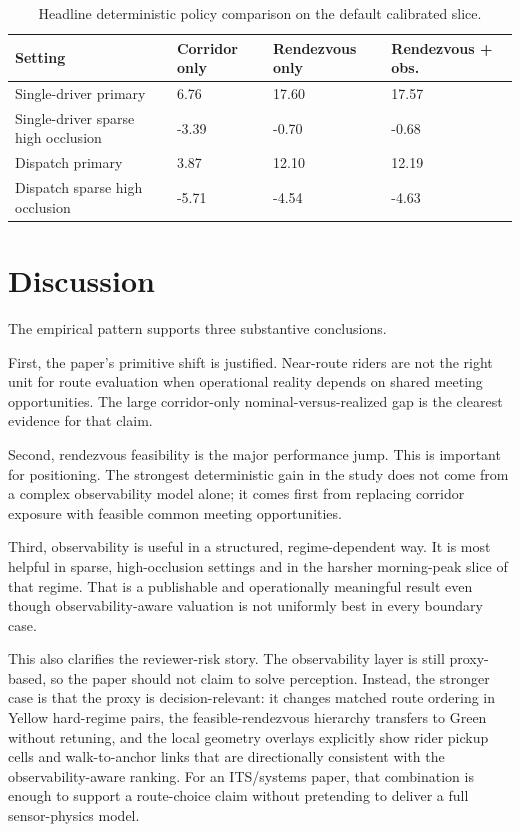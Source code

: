 \documentclass[journal]{IEEEtran}
\begin{document}
\begin{table}[!t]
\caption{Headline deterministic policy comparison on the default calibrated slice.}
\label{tab:headline}
\centering
\footnotesize
\begin{tabularx}{\columnwidth}{|L{0.34\columnwidth}|X|X|X|}
\hline
{}\textbf{Setting} & \textbf{Corridor only} & \textbf{Rendezvous only} & \textbf{Rendezvous + obs.} \\
\hline
Single-driver primary & 6.76 & 17.60 & 17.57 \\
\hline
Single-driver sparse high occlusion & -3.39 & -0.70 & -0.68 \\
\hline
Dispatch primary & 3.87 & 12.10 & 12.19 \\
\hline
Dispatch sparse high occlusion & -5.71 & -4.54 & -4.63 \\
\hline
\end{tabularx}
\end{table}

\section{Discussion}
The empirical pattern supports three substantive conclusions.

First, the paper's primitive shift is justified. Near-route riders are not the right unit for route evaluation when operational reality depends on shared meeting opportunities. The large corridor-only nominal-versus-realized gap is the clearest evidence for that claim.

Second, rendezvous feasibility is the major performance jump. This is important for positioning. The strongest deterministic gain in the study does not come from a complex observability model alone; it comes first from replacing corridor exposure with feasible common meeting opportunities.

Third, observability is useful in a structured, regime-dependent way. It is most helpful in sparse, high-occlusion settings and in the harsher morning-peak slice of that regime. That is a publishable and operationally meaningful result even though observability-aware valuation is not uniformly best in every boundary case.

This also clarifies the reviewer-risk story. The observability layer is still proxy-based, so the paper should not claim to solve perception. Instead, the stronger case is that the proxy is decision-relevant: it changes matched route ordering in Yellow hard-regime pairs, the feasible-rendezvous hierarchy transfers to Green without retuning, and the local geometry overlays explicitly show rider pickup cells and walk-to-anchor links that are directionally consistent with the observability-aware ranking. For an ITS/systems paper, that combination is enough to support a route-choice claim without pretending to deliver a full sensor-physics model.
\end{document}
